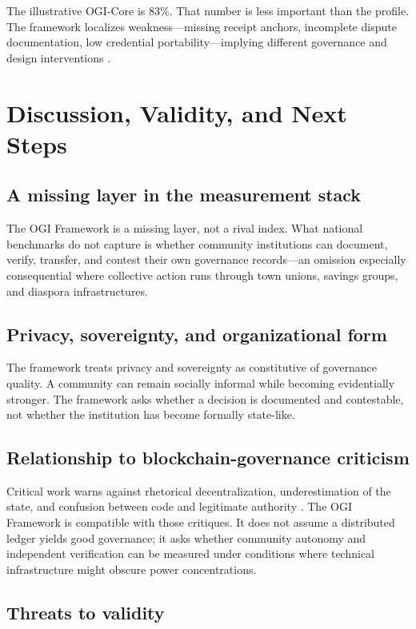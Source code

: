 \documentclass[sigconf,anonymous]{acmart}
\begin{document}
The illustrative OGI-Core is 83\%. That number is less important than the profile. The framework localizes weakness---missing receipt anchors, incomplete dispute documentation, low credential portability---implying different governance and design interventions \cite{adebayo2018,francois2021,bjorkman2009}.

\section{Discussion, Validity, and Next Steps}

\subsection{A missing layer in the measurement stack}

The OGI Framework is a missing layer, not a rival index. What national benchmarks do not capture is whether community institutions can document, verify, transfer, and contest their own governance records---an omission especially consequential where collective action runs through town unions, savings groups, and diaspora infrastructures.

\subsection{Privacy, sovereignty, and organizational form}

The framework treats privacy and sovereignty as constitutive of governance quality. A community can remain socially informal while becoming evidentially stronger. The framework asks whether a decision is documented and contestable, not whether the institution has become formally state-like.

\subsection{Relationship to blockchain-governance criticism}

Critical work warns against rhetorical decentralization, underestimation of the state, and confusion between code and legitimate authority \cite{atzori2017,schneider2019,defilippi2018}. The OGI Framework is compatible with those critiques. It does not assume a distributed ledger yields good governance; it asks whether community autonomy and independent verification can be measured under conditions where technical infrastructure might obscure power concentrations.

\subsection{Threats to validity}
\end{document}
